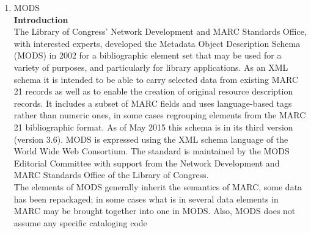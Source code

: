 \begin{enumerate}
	\item MODS\\
	{\bf Introduction}\\
	The Library of Congress' Network Development and MARC Standards Office, with interested experts, developed the Metadata Object Description Schema (MODS) in 2002 for a bibliographic element set that may be used for a variety of purposes, and particularly for library applications. As an XML schema it is intended to be able to carry selected data from existing MARC 21 records as well as to enable the creation of original resource description records. It includes a subset of MARC fields and uses language-based tags rather than numeric ones, in some cases regrouping elements from the MARC 21 bibliographic format. As of May 2015 this schema is in its third version (version 3.6). MODS is expressed using the XML schema language of the World Wide Web Consortium. The standard is maintained by the MODS Editorial Committee with support from the Network Development and MARC Standards Office of the Library of Congress.\\
	
	The elements of MODS generally inherit the semantics of MARC, some data has been repackaged; in some cases what is in several data elements in MARC may be brought together into one in MODS. Also, MODS does not assume any specific cataloging code\\
	

\end{enumerate}
